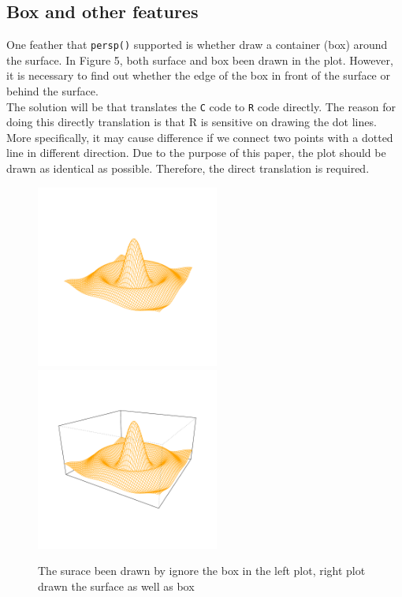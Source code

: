 \documentclass[paper=a4, fontsize=11pt]{report}
\begin{document}
\subsection{Box and other features}
One feather that \texttt{persp()} supported is whether draw a container (box) around the surface. In Figure 5, both surface and box been drawn in the plot. However, it is necessary to find out whether the edge of the box in front of the surface or behind the surface. \\

The solution will be that translates the \texttt{C} code to \texttt{R} code directly. The reason for doing this directly translation is that R is sensitive on drawing the dot lines. More specifically, it may cause difference if we connect two points with a dotted line in different direction. Due to the purpose of this paper, the plot should be drawn as identical as possible. Therefore, the direct translation is required.\\


\newpage
\begin{figure}[h]
\begin{center}
  \includegraphics[height = 6cm, width = 6cm]{figure/box_example_1.pdf}
  \includegraphics[height = 6cm, width = 6cm]{figure/box_example_2.pdf}
  \caption{The surace been drawn by ignore the box in the left plot, right plot drawn the surface as well as box}
  	\label{figure8}
\end{center}
\end{figure}
\end{document}
